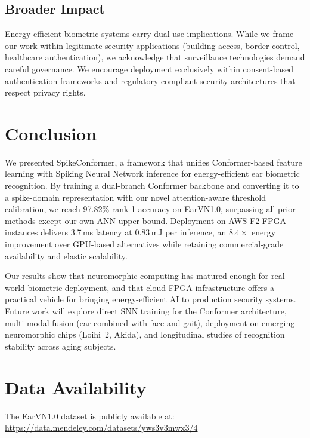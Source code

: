 \documentclass[11pt,a4paper]{article}
\begin{document}
\subsection{Broader Impact}

Energy-efficient biometric systems carry dual-use implications. While we frame our work within legitimate security applications (building access, border control, healthcare authentication), we acknowledge that surveillance technologies demand careful governance. We encourage deployment exclusively within consent-based authentication frameworks and regulatory-compliant security architectures that respect privacy rights.

\section{Conclusion}\label{sec:conclusion}

We presented SpikeConformer, a framework that unifies Conformer-based feature learning with Spiking Neural Network inference for energy-efficient ear biometric recognition. By training a dual-branch Conformer backbone and converting it to a spike-domain representation with our novel attention-aware threshold calibration, we reach 97.82\% rank-1 accuracy on EarVN1.0, surpassing all prior methods except our own ANN upper bound. Deployment on AWS F2 FPGA instances delivers 3.7\,ms latency at 0.83\,mJ per inference, an $8.4\times$ energy improvement over GPU-based alternatives while retaining commercial-grade availability and elastic scalability.

Our results show that neuromorphic computing has matured enough for real-world biometric deployment, and that cloud FPGA infrastructure offers a practical vehicle for bringing energy-efficient AI to production security systems. Future work will explore direct SNN training for the Conformer architecture, multi-modal fusion (ear combined with face and gait), deployment on emerging neuromorphic chips (Loihi~2, Akida), and longitudinal studies of recognition stability across aging subjects.

\section*{Data Availability}
The EarVN1.0 dataset is publicly available at: \url{https://data.mendeley.com/datasets/yws3v3mwx3/4}
\end{document}
